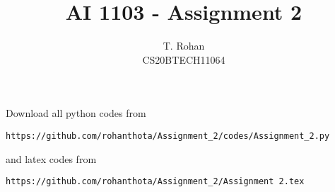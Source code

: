 \documentclass[journal,12pt,twocolumn]{IEEEtran}
\DeclareMathOperator*{\Res}{Res}
\begin{document}
\newcommand{\BEQA}{\begin{eqnarray}}
\newcommand{\EEQA}{\end{eqnarray}}
\newcommand{\define}{\stackrel{\triangle}{=}}

\raggedbottom
\setlength{\parindent}{0pt}
\providecommand{\mbf}{\mathbf}
\providecommand{\pr}[1]{\ensuremath{\Pr\left(#1\right)}}
\providecommand{\qfunc}[1]{\ensuremath{Q\left(#1\right)}}
\providecommand{\sbrak}[1]{\ensuremath{{}\left[#1\right]}}
\providecommand{\lsbrak}[1]{\ensuremath{{}\left[#1\right.}}
\providecommand{\rsbrak}[1]{\ensuremath{{}\left.#1\right]}}
\providecommand{\brak}[1]{\ensuremath{\left(#1\right)}}
\providecommand{\lbrak}[1]{\ensuremath{\left(#1\right.}}
\providecommand{\rbrak}[1]{\ensuremath{\left.#1\right)}}
\providecommand{\cbrak}[1]{\ensuremath{\left\{#1\right\}}}
\providecommand{\lcbrak}[1]{\ensuremath{\left\{#1\right.}}
\providecommand{\rcbrak}[1]{\ensuremath{\left.#1\right\}}}
\theoremstyle{remark}
\newtheorem{rem}{Remark}
\newcommand{\sgn}{\mathop{\mathrm{sgn}}}
\providecommand{\abs}[1]{\vert#1\vert}
\providecommand{\res}[1]{\Res\displaylimits_{#1}} 
\providecommand{\norm}[1]{\lVert#1\rVert}
\providecommand{\mtx}[1]{\mathbf{#1}}
\providecommand{\mean}[1]{E[ #1 ]}
\providecommand{\fourier}{\overset{\mathcal{F}}{ \rightleftharpoons}}
\providecommand{\system}{\overset{\mathcal{H}}{ \longleftrightarrow}}
\newcommand{\solution}{\noindent \textbf{Solution: }}
\newcommand{\cosec}{\,\text{cosec}\,}
\providecommand{\dec}[2]{\ensuremath{\overset{#1}{\underset{#2}{\gtrless}}}}
\newcommand{\myvec}[1]{\ensuremath{\begin{pmatrix}#1\end{pmatrix}}}
\newcommand{\mydet}[1]{\ensuremath{\begin{vmatrix}#1\end{vmatrix}}}
\makeatletter
{}
\makeatother
\let\StandardTheFigure\thefigure
\let\vec\mathbf
\renewcommand{\thefigure}{\theproblem}
\def\putbox#1#2#3{\makebox[0in][l]{\makebox[#1][l]{}\raisebox{\baselineskip}[0in][0in]{\raisebox{#2}[0in][0in]{#3}}}}
     \def\rightbox#1{\makebox[0in][r]{#1}}
     \def\centbox#1{\makebox[0in]{#1}}
     \def\topbox#1{\raisebox{-\baselineskip}[0in][0in]{#1}}
     \def\midbox#1{\raisebox{-0.5\baselineskip}[0in][0in]{#1}}
\vspace{3cm}
\title{AI 1103 - Assignment 2}
\author{T. Rohan \\ CS20BTECH11064}
\maketitle
\newpage
\bigskip
\renewcommand{\thefigure}{\theenumi}
\renewcommand{\thetable}{\theenumi}
Download all python codes from 
\begin{lstlisting}
https://github.com/rohanthota/Assignment_2/codes/Assignment_2.py
\end{lstlisting}
%
and latex codes from
%
\begin{lstlisting}
https://github.com/rohanthota/Assignment_2/Assignment 2.tex
\end{lstlisting}
\end{document}
